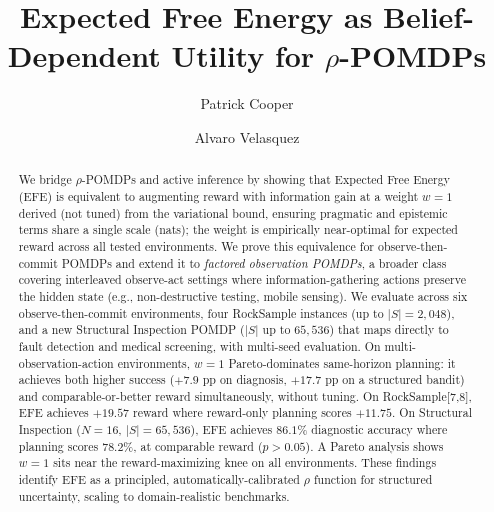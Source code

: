 \documentclass[runningheads]{llncs}
\begin{document}
\title{Expected Free Energy as Belief-Dependent Utility for $\rho$-POMDPs}


\author{Patrick Cooper \and Alvaro Velasquez}



\maketitle

\begin{abstract}
We bridge $\rho$-POMDPs and active inference by showing that Expected Free Energy (EFE) is equivalent to augmenting reward with information gain at a weight $w{=}1$ derived (not tuned) from the variational bound, ensuring pragmatic and epistemic terms share a single scale (nats); the weight is empirically near-optimal for expected reward across all tested environments. We prove this equivalence for observe-then-commit POMDPs and extend it to \emph{factored observation POMDPs}, a broader class covering interleaved observe-act settings where information-gathering actions preserve the hidden state (e.g., non-destructive testing, mobile sensing). We evaluate across six observe-then-commit environments, four RockSample instances (up to $|S|{=}2{,}048$), and a new Structural Inspection POMDP ($|S|$ up to $65{,}536$) that maps directly to fault detection and medical screening, with multi-seed evaluation. On multi-observation-action environments, $w{=}1$ Pareto-dominates same-horizon planning: it achieves both higher success ($+7.9$ pp on diagnosis, $+17.7$ pp on a structured bandit) and comparable-or-better reward simultaneously, without tuning. On RockSample[7,8], EFE achieves $+19.57$ reward where reward-only planning scores $+11.75$. On Structural Inspection ($N{=}16$, $|S|{=}65{,}536$), EFE achieves $86.1\%$ diagnostic accuracy where planning scores $78.2\%$, at comparable reward ($p > 0.05$). A Pareto analysis shows $w{=}1$ sits near the reward-maximizing knee on all environments. These findings identify EFE as a principled, automatically-calibrated $\rho$ function for structured uncertainty, scaling to domain-realistic benchmarks.
\end{abstract}
\end{document}
